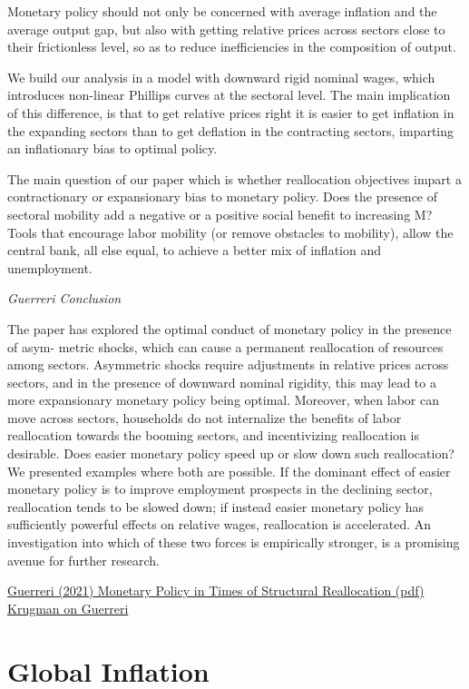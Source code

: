 \documentclass[
]{book}
\begin{document}
Monetary policy should not only be concerned with average inflation
and the average output gap, but also with getting relative prices across sectors close to
their frictionless level, so as to reduce inefficiencies in the composition of output.

We build our analysis in a model with downward rigid
nominal wages, which introduces non-linear Phillips curves at the sectoral level. The main
implication of this difference, is that to get relative prices right it is easier to get inflation
in the expanding sectors than to get deflation in the contracting sectors, imparting an
inflationary bias to optimal policy.

The main question of our paper which is whether reallocation objectives
impart a contractionary or expansionary bias to monetary policy.
Does the presence of sectoral mobility add a negative or a positive
social benefit to increasing M?
Tools that encourage labor mobility (or remove obstacles to mobility), allow the central
bank, all else equal, to achieve a better mix of inflation and unemployment.

\emph{Guerreri Conclusion}

The paper has explored the optimal conduct of monetary policy in the presence of asym-
metric shocks, which can cause a permanent reallocation of resources among sectors.
Asymmetric shocks require adjustments in relative prices across sectors, and in the
presence of downward nominal rigidity, this may lead to a more expansionary monetary
policy being optimal.
Moreover, when labor can move across sectors, households do not internalize the
benefits of labor reallocation towards the booming sectors, and incentivizing reallocation
is desirable. Does easier monetary policy speed up or slow down such reallocation? We
presented examples where both are possible. If the dominant effect of easier monetary
policy is to improve employment prospects in the declining sector, reallocation tends to
be slowed down; if instead easier monetary policy has sufficiently powerful effects on
relative wages, reallocation is accelerated. An investigation into which of these two forces
is empirically stronger, is a promising avenue for further research.

\href{Guerrieri_2021_Monetary_Structural_Reallocation.pdf}{Guerreri (2021) Monetary Policy in Times of Structural Reallocation (pdf)}
\href{https://mastodon.online/@pkrugman/109490436829469676}{Krugman on Guerreri}

\hypertarget{global-inflation}{%
\section{Global Inflation}\label{global-inflation}}
\end{document}

